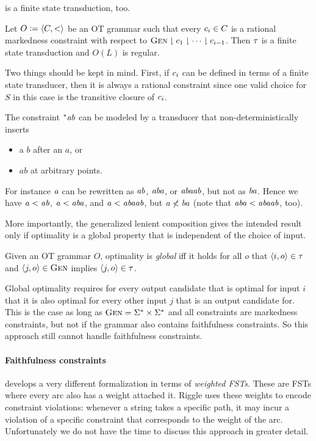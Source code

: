 %
is a finite state transduction, too.
%
\begin{theorem}
    Let $O \mathrel{\mathop:}= \left \langle C,< \right \rangle $ be an OT grammar such that every $c_i \in C$ is a rational markedness constraint with respect to $\textsc{Gen} \downharpoonright c_1 \downharpoonright \cdots \downharpoonright c_{i-1}$.
    Then $\tau$ is a finite state transduction and $O(L)$ is regular.
\end{theorem}
%
Two things should be kept in mind.
First, if $c_i$ can be defined in terms of a finite state transducer, then it is always a rational constraint since one valid choice for $S$ in this case is the transitive closure of $c_i$.
%
\begin{examplebox}
    The constraint $^*\mathit{ab}$ can be modeled by a transducer that non-deterministically inserts
    \begin{itemize}
        \item a $b$ after an $a$, or
        \item $ab$ at arbitrary points.
    \end{itemize}
    For instance $\mathit{a}$ can be rewritten as $\mathit{ab}$, $\mathit{aba}$, or $\mathit{abaab}$, but not as $\mathit{ba}$.
    Hence we have $\mathit{a} < \mathit{ab}$, $\mathit{a} < \mathit{aba}$, and $\mathit{a} < \mathit{abaab}$, but $\mathit{a} \not< \mathit{ba}$ (note that $\mathit{aba} < \mathit{abaab}$, too).
\end{examplebox}
%
More importantly, the generalized lenient composition gives the intended result only if optimality is a global property that is independent of the choice of input.
%
\begin{definition}
    Given an OT grammar $O$, optimality is \emph{global} iff it holds for all $o$ that $\left \langle i,o \right \rangle  \in \tau$ and $\left \langle j,o \right \rangle  \in \textsc{Gen}$ implies $\left \langle j,o \right \rangle  \in \tau$.
\end{definition}
%
Global optimality requires for every output candidate that is optimal for input $i$ that it is also optimal for every other input $j$ that is an output candidate for.
This is the case as long as $\textsc{Gen} = \Sigma^* \times \Sigma^*$ and all constraints are markedness constraints, but not if the grammar also contains faithfulness constraints.
So this approach still cannot handle faithfulness constraints.

\paragraph{Faithfulness constraints}
\citet{Riggle04} develops a very different formalization in terms of \emph{weighted FSTs}.
These are FSTs where every arc also has a weight attached it.
Riggle uses these weights to encode constraint violations: whenever a string takes a specific path, it may incur a violation of a specific constraint that corresponds to the weight of the arc.
Unfortunately we do not have the time to discuss this approach in greater detail.

